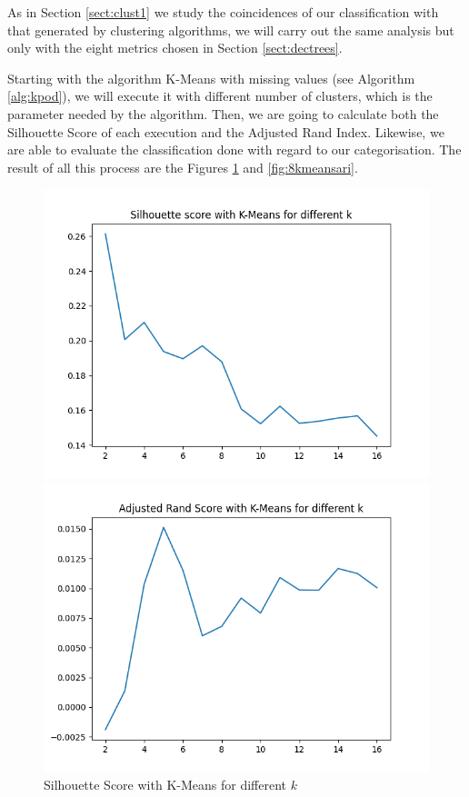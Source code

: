 As in Section \ref{sect:clust1} we study the coincidences of our classification with that generated by clustering algorithms, we will carry out the same analysis but only with the eight metrics chosen in Section \ref{sect:dectrees}.

Starting with the algorithm K-Means with missing values (see Algorithm \ref{alg:kpod}), we will execute it with different number of clusters, which is the parameter needed by the algorithm. Then, we are going to calculate both the Silhouette Score of each execution and the Adjusted Rand Index. Likewise, we are able to evaluate the classification done with regard to our categorisation. The result of all this process are the Figures \ref{fig:8kmeanssil} and \ref{fig:8kmeansari}.

\begin{figure}
	\hspace{-1cm}\begin{minipage}[b]{0.4\paperwidth}
		\centerline{\includegraphics[width=\textwidth]{Imagenes/Bitmap/Clustering/kmeans8sil.png}}%
		\caption{Silhouette Score with K-Means for different $k$}%
		\label{fig:8kmeanssil}
	\end{minipage}
	\hspace{0.4cm}
	\begin{minipage}[b]{0.4\paperwidth}
		\centerline{\includegraphics[width=\textwidth]{Imagenes/Bitmap/Clustering/kmeans8ari.png}}%

\end{minipage}
\end{figure}
